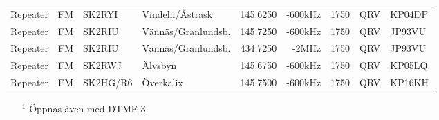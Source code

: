 \begin{landscape}
\begin{longtable}{llllrrlcl}
	Repeater                  & FM            & SK2RYI        & Vindeln/Åsträsk     & 145.6250          & -600kHz        & 1750             & QRV             & KP04DP           \\
	Repeater                  & FM            & SK2RIU        & Vännäs/Granlundsb.  & 145.7250          & -600kHz        & 1750             & QRV             & JP93VU           \\
	Repeater                  & FM            & SK2RIU        & Vännäs/Granlundsb.  & 434.7250          & -2MHz          & 1750             & QRV             & JP93VU           \\
	Repeater                  & FM            & SK2RWJ        & Älvsbyn             & 145.6750          & -600kHz        & 1750             & QRV             & KP05LQ           \\
	Repeater                  & FM            & SK2HG/R6      & Överkalix           & 145.7500          & -600kHz        & 1750             & QRV             & KP16KH
\end{longtable}
\begin{itemize}
	\item[$^1$] Öppnas även med DTMF 3
\end{itemize}
\normalsize

\end{landscape}
